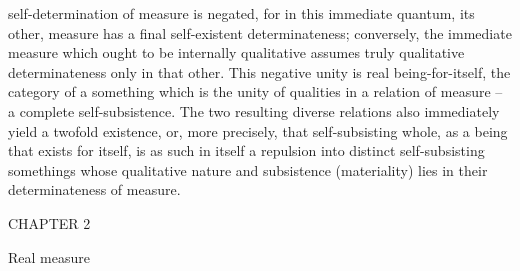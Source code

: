 self-determination of measure is negated, for in this immediate quantum,
its other, measure has a final self-existent determinateness; conversely, the
immediate measure which ought to be internally qualitative assumes truly
qualitative determinateness only in that other. This negative unity is real
being-for-itself, the category of a something which is the unity of qualities in a
relation of measure – a complete self-subsistence. The two resulting diverse
relations also immediately yield a twofold existence, or, more precisely,
that self-subsisting whole, as a being that exists for itself, is as such in itself
a repulsion into distinct self-subsisting somethings whose qualitative nature
and subsistence (materiality) lies in their determinateness of measure.

CHAPTER 2

Real measure


